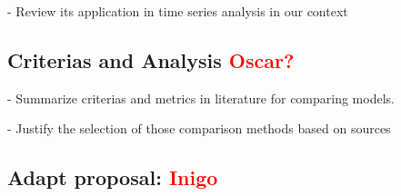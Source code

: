 \documentclass[12pt, letterpaper]{article}
\begin{document}
    - Review its application in time series analysis in our context


\subsection*{Criterias and Analysis \textcolor{red}{Oscar?}}
- Summarize criterias and metrics in literature for comparing models.

- Justify the selection of those comparison methods based on sources



\subsection*{Adapt proposal: \textcolor{red}{Inigo}}
\end{document}

